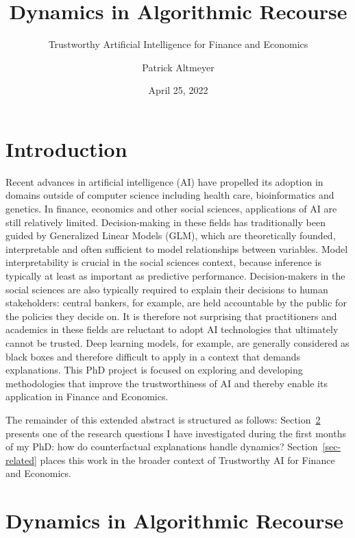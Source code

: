 \documentclass[
]{acmconf}
\title{Dynamics in Algorithmic Recourse}
\subtitle{Trustworthy Artificial Intelligence for Finance and Economics}
\author{Patrick Altmeyer}
\date{April 25, 2022}
\begin{document}
\maketitle

\ifdefined\Shaded\renewenvironment{Shaded}{\begin{tcolorbox}[boxrule=0pt, breakable, sharp corners, interior hidden, enhanced, borderline west={3pt}{0pt}{shadecolor}, frame hidden]}{\end{tcolorbox}}\fi

\hypertarget{introduction}{%
\section{Introduction}\label{introduction}}

Recent advances in artificial intelligence (AI) have propelled its
adoption in domains outside of computer science including health care,
bioinformatics and genetics. In finance, economics and other social
sciences, applications of AI are still relatively limited.
Decision-making in these fields has traditionally been guided by
Generalized Linear Models (GLM), which are theoretically founded,
interpretable and often sufficient to model relationships between
variables. Model interpretability is crucial in the social sciences
context, because inference is typically at least as important as
predictive performance. Decision-makers in the social sciences are also
typically required to explain their decisions to human stakeholders:
central bankers, for example, are held accountable by the public for the
policies they decide on. It is therefore not surprising that
practitioners and academics in these fields are reluctant to adopt AI
technologies that ultimately cannot be trusted. Deep learning models,
for example, are generally considered as black boxes and therefore
difficult to apply in a context that demands explanations. This PhD
project is focused on exploring and developing methodologies that
improve the trustworthiness of AI and thereby enable its application in
Finance and Economics.

The remainder of this extended abstract is structured as follows:
Section~\ref{sec-main} presents one of the research questions I have
investigated during the first months of my PhD: how do counterfactual
explanations handle dynamics? Section~\ref{sec-related} places this work
in the broader context of Trustworthy AI for Finance and Economics.

\hypertarget{sec-main}{%
\section{Dynamics in Algorithmic Recourse}\label{sec-main}}
\end{document}
